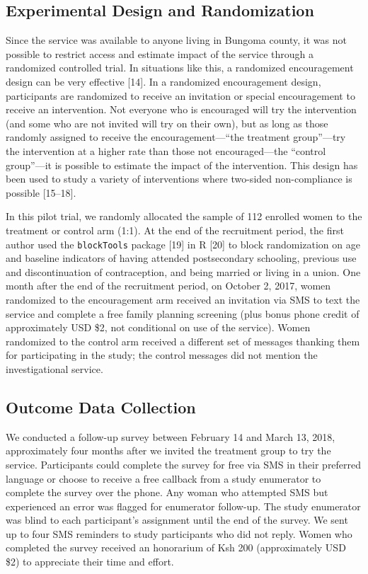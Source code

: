 \documentclass[man]{apa6}
\theoremstyle{definition}
\theoremstyle{definition}
\theoremstyle{definition}
\theoremstyle{remark}
\begin{document}
\hypertarget{experimental-design-and-randomization}{%
\subsection{Experimental Design and
Randomization}\label{experimental-design-and-randomization}}

Since the service was available to anyone living in Bungoma county, it
was not possible to restrict access and estimate impact of the service
through a randomized controlled trial. In situations like this, a
randomized encouragement design can be very effective {[}14{]}. In a
randomized encouragement design, participants are randomized to receive
an invitation or special encouragement to receive an intervention. Not
everyone who is encouraged will try the intervention (and some who are
not invited will try on their own), but as long as those randomly
assigned to receive the encouragement---\enquote{the treatment
group}---try the intervention at a higher rate than those not
encouraged---the \enquote{control group}---it is possible to estimate
the impact of the intervention. This design has been used to study a
variety of interventions where two-sided non-compliance is possible
{[}15--18{]}.

In this pilot trial, we randomly allocated the sample of 112 enrolled
women to the treatment or control arm (1:1). At the end of the
recruitment period, the first author used the \texttt{blockTools}
package {[}19{]} in R {[}20{]} to block randomization on age and
baseline indicators of having attended postsecondary schooling, previous
use and discontinuation of contraception, and being married or living in
a union. One month after the end of the recruitment period, on October
2, 2017, women randomized to the encouragement arm received an
invitation via SMS to text the service and complete a free family
planning screening (plus bonus phone credit of approximately USD \$2,
not conditional on use of the service). Women randomized to the control
arm received a different set of messages thanking them for participating
in the study; the control messages did not mention the investigational
service.

\hypertarget{outcome-data-collection}{%
\subsection{Outcome Data Collection}\label{outcome-data-collection}}

We conducted a follow-up survey between February 14 and March 13, 2018,
approximately four months after we invited the treatment group to try
the service. Participants could complete the survey for free via SMS in
their preferred language or choose to receive a free callback from a
study enumerator to complete the survey over the phone. Any woman who
attempted SMS but experienced an error was flagged for enumerator
follow-up. The study enumerator was blind to each participant's
assignment until the end of the survey. We sent up to four SMS reminders
to study participants who did not reply. Women who completed the survey
received an honorarium of Ksh 200 (approximately USD \$2) to appreciate
their time and effort.
\end{document}
